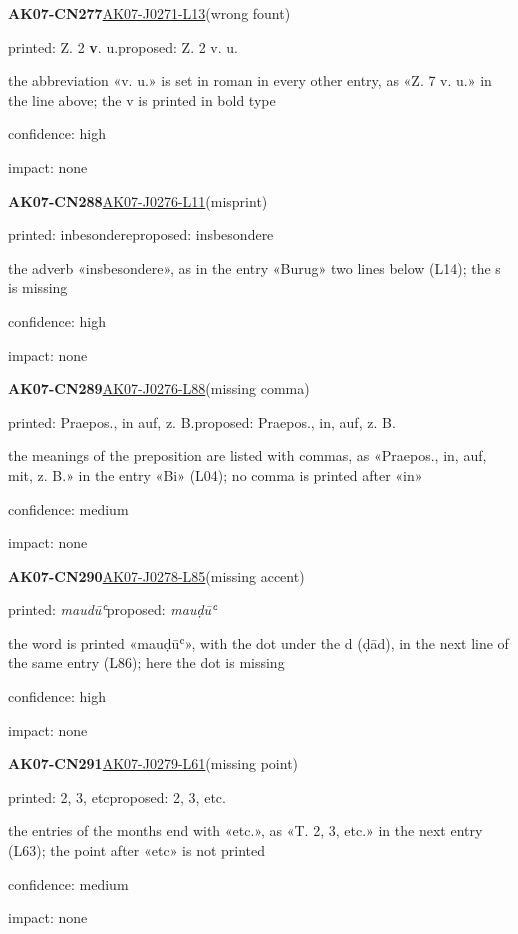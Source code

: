 \documentclass[11pt]{article}
\begin{document}
\noindent\textbf{AK07-CN277}\enspace\hyperlink{AK07-J0271-L13}{AK07-J0271-L13}\enspace(wrong fount)\par\noindent printed: Z. 2 \textbf{v}. u.\enspace proposed: Z. 2 v. u.\par\noindent the abbreviation «v. u.» is set in roman in every other entry, as «Z. 7 v. u.» in the line above; the v is printed in bold type\par\noindent confidence: high\par\noindent impact: none\par\medskip
\noindent\textbf{AK07-CN288}\enspace\hyperlink{AK07-J0276-L11}{AK07-J0276-L11}\enspace(misprint)\par\noindent printed: inbesondere\enspace proposed: insbesondere\par\noindent the adverb «insbesondere», as in the entry «Burug» two lines below (L14); the s is missing\par\noindent confidence: high\par\noindent impact: none\par\medskip
\noindent\textbf{AK07-CN289}\enspace\hyperlink{AK07-J0276-L88}{AK07-J0276-L88}\enspace(missing comma)\par\noindent printed: Praepos., in auf, z. B.\enspace proposed: Praepos., in, auf, z. B.\par\noindent the meanings of the preposition are listed with commas, as «Praepos., in, auf, mit, z. B.» in the entry «Bi» (L04); no comma is printed after «in»\par\noindent confidence: medium\par\noindent impact: none\par\medskip
\noindent\textbf{AK07-CN290}\enspace\hyperlink{AK07-J0278-L85}{AK07-J0278-L85}\enspace(missing accent)\par\noindent printed: \textit{maudūʿ}\enspace proposed: \textit{mauḍūʿ}\par\noindent the word is printed «mauḍūʿ», with the dot under the d (ḍād), in the next line of the same entry (L86); here the dot is missing\par\noindent confidence: high\par\noindent impact: none\par\medskip
\noindent\textbf{AK07-CN291}\enspace\hyperlink{AK07-J0279-L61}{AK07-J0279-L61}\enspace(missing point)\par\noindent printed: 2, 3, etc\enspace proposed: 2, 3, etc.\par\noindent the entries of the months end with «etc.», as «T. 2, 3, etc.» in the next entry (L63); the point after «etc» is not printed\par\noindent confidence: medium\par\noindent impact: none\par\medskip
\end{document}
